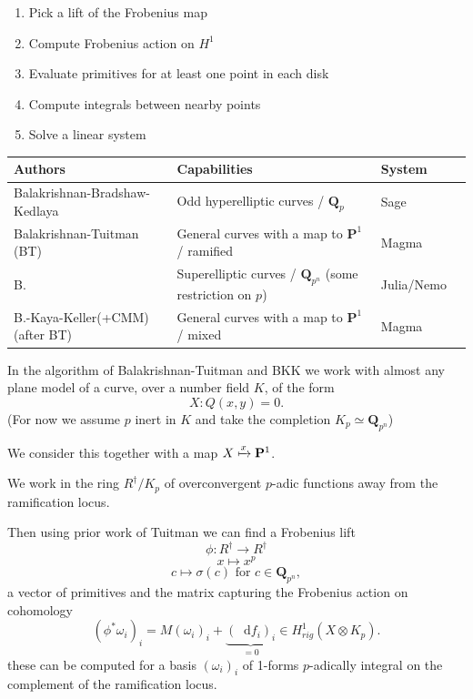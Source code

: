 \documentclass[oneside,11pt,]{article}
\newcommand{\diff}{\mathop{}\!\mathrm{d}}
\newcommand{\QQ}{\mathbf{Q}}
\begin{document}
\begin{enumerate}[itemsep=-5mm]
    \item Pick a lift of the Frobenius map
    \item Compute Frobenius action on $H^1$
    \item Evaluate primitives for at least one point in each disk
    \item Compute integrals between nearby points
    \item Solve a linear system
\end{enumerate}
\begin{table}[h!]
    \begin{tabular}{p{60mm}p{60mm}ll}
        Authors                       & Capabilities                                                 & System      \\ \hline
        Balakrishnan-Bradshaw-Kedlaya & Odd hyperelliptic curves / $\QQ_p$                                & Sage       \\
        Balakrishnan-Tuitman (BT)     & General curves with a map to $\mathbf{P}^1$ / ramified & Magma  \\
        B.                            & Superelliptic curves / $\QQ_{p^n}$ (some restriction on $p$)                         & Julia/Nemo  \\
        B.-Kaya-Keller(+CMM) (after BT)     & General curves with a map to $\mathbf{P}^1$ / mixed          & Magma   
    \end{tabular}
\end{table}

In the algorithm of Balakrishnan-Tuitman and BKK we work with almost any plane model of a curve, over a number field $K$, of the form
$$X \colon Q(x,y) = 0.$$
(For now we assume $p$ inert in $K$ and take the completion $K_p \simeq \QQ_{p^n}$)

We consider this together with a map $X \xmapsto{x} \mathbf P^1$.

We work in the ring $R^\dagger/K_p$ of overconvergent $p$-adic functions away from the ramification locus.

Then using prior work of Tuitman we can find a Frobenius lift
$$\phi \colon R^\dagger \to R^\dagger$$
$$x\mapsto x^p$$
$$c \mapsto \sigma (c)\text{ for }c \in \QQ_{p^n},$$
a vector of primitives and the matrix capturing the Frobenius action on cohomology
$$
(\phi ^* \omega _i)_i  = M(\omega _i)_i + \underbrace{(\diff f_i)_i}_{=0} \in H^1_{rig}(X\otimes K_p)\text{.}
$$
these can be computed for a basis $(\omega_i)_i$ of 1-forms $p$-adically integral on the complement of the ramification locus.
\end{document}
